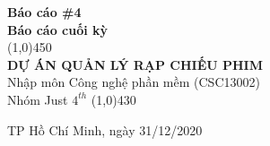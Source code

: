 \documentclass[a4paper, 12pt]{article}
\begin{document}
\begin{titlepage}
	\begin{center}
		\vspace*{1cm}
		\Large\textbf{Báo cáo \#4\\Báo cáo cuối kỳ}\\

		\vfill
		\line(1,0){450}\\[4mm]
		\LARGE\textbf{\MakeUppercase{Dự án quản lý rạp chiếu phim}}\\[3mm]
		\Large{Nhập môn Công nghệ phần mềm (CSC13002)}\\[3mm]
		\Large{Nhóm Just $4^{th}$}
		\line(1,0){430}\\
		\vfill

		\vfill
		TP Hồ Chí Minh, ngày 31/12/2020
	\end{center}
\end{titlepage}

\tableofcontents
\thispagestyle{empty}
\clearpage
\end{document}

